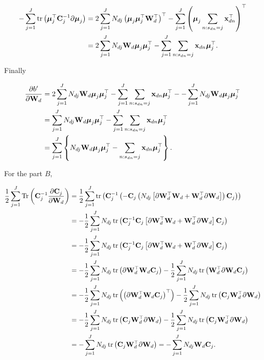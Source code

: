 	\begin{align}
	-\sum_{j=1}^{J}\operatorname{tr}\left( \boldsymbol{\mu}_j^\top\mathbf{C}_j^{-1}\partial\boldsymbol{\mu}_j\right) &= 2\sum_{j=1}^{J}N_{dj}\left(\boldsymbol{\mu}_j\boldsymbol{\mu}_j^\top\mathbf{W}_d^\top\right)^\top-\sum_{j=1}^{J}\left(\boldsymbol{\mu}_j\sum_{n:s_{dn}=j}\mathbf{x}_{dn}^\top\right)^\top \notag \\
	&= 2\sum_{j=1}^{J}N_{dj}\mathbf{W}_d\boldsymbol{\mu}_j\boldsymbol{\mu}_j^\top - \sum_{j=1}^{J}\sum_{n:s_{dn}=j}\mathbf{x}_{dn} \boldsymbol{\mu}_j^\top .
	\end{align}
	
	Finally 
	
	\begin{align}
	\frac{\partial b'}{\partial\mathbf{W}_d} &= 2\sum_{j=1}^{J}N_{dj}\mathbf{W}_d\boldsymbol{\mu}_j\boldsymbol{\mu}_j^\top - \sum_{j=1}^{J}\sum_{n:s_{dn}=j}\mathbf{x}_{dn} \boldsymbol{\mu}_j^\top -  -\sum_{j=1}^{J} N_{dj} \mathbf{W}_d \boldsymbol{\mu}_j\boldsymbol{\mu}_j^\top \notag \\
	&= \sum_{j=1}^{J}N_{dj}\mathbf{W}_d\boldsymbol{\mu}_j\boldsymbol{\mu}_j^\top - \sum_{j=1}^{J}\sum_{n:s_{dn}=j}\mathbf{x}_{dn} \boldsymbol{\mu}_j^\top \notag \\
	&= \sum_{j=1}^{J}\left\{N_{dj}\mathbf{W}_d\boldsymbol{\mu}_j\boldsymbol{\mu}_j^\top - \sum_{n:s_{dn}=j}\mathbf{x}_{dn} \boldsymbol{\mu}_j^\top\right\}.
	\end{align}
	
	For the part $B$,
	
	\begin{align}
	\frac{1}{2}\sum_{j=1}^{J} \operatorname{Tr}\left(\mathbf{C}_j^{-1}\frac{\partial \mathbf{C}_j}{\partial\mathbf{W}_d}\right) &= \frac{1}{2}\sum_{j=1}^{J} \operatorname{tr}\left(\mathbf{C}_j^{-1}\left(-\mathbf{C}_j\left(N_{dj}\left[\partial\mathbf{W}_d^\top\mathbf{W}_d+\mathbf{W}_d^\top\partial\mathbf{W}_d\right]\right)\mathbf{C}_j\right)\right) \notag \\
	&= -\frac{1}{2}\sum_{j=1}^{J}N_{dj}\operatorname{tr}\left(\mathbf{C}_j^{-1}\mathbf{C}_j\left[\partial\mathbf{W}_d^\top\mathbf{W}_d+\mathbf{W}_d^\top\partial\mathbf{W}_d\right]\mathbf{C}_j\right) \notag \\
	&= -\frac{1}{2}\sum_{j=1}^{J}N_{dj}\operatorname{tr}\left(\mathbf{C}_j^{-1}\mathbf{C}_j\left[\partial\mathbf{W}_d^\top\mathbf{W}_d+\mathbf{W}_d^\top\partial\mathbf{W}_d\right]\mathbf{C}_j\right) \notag \\
	&= -\frac{1}{2}\sum_{j=1}^{J}N_{dj}\operatorname{tr}\left(\partial\mathbf{W}_d^\top\mathbf{W}_d\mathbf{C}_j\right) -\frac{1}{2}\sum_{j=1}^{J}N_{dj}\operatorname{tr}\left(\mathbf{W}_d^\top\partial\mathbf{W}_d\mathbf{C}_j\right)\notag \\
	&= -\frac{1}{2}\sum_{j=1}^{J}N_{dj}\operatorname{tr}\left(\left(\partial\mathbf{W}_d^\top\mathbf{W}_d\mathbf{C}_j\right)^\top\right) -\frac{1}{2}\sum_{j=1}^{J}N_{dj}\operatorname{tr}\left(\mathbf{C}_j\mathbf{W}_d^\top\partial\mathbf{W}_d\right)\notag \\
	&= -\frac{1}{2}\sum_{j=1}^{J}N_{dj}\operatorname{tr}\left(\mathbf{C}_j\mathbf{W}_d^\top\partial\mathbf{W}_d\right) -\frac{1}{2}\sum_{j=1}^{J}N_{dj}\operatorname{tr}\left(\mathbf{C}_j\mathbf{W}_d^\top\partial\mathbf{W}_d\right)\notag \\
	&=-\sum_{j=1}^{J}N_{dj}\operatorname{tr}\left(\mathbf{C}_j\mathbf{W}_d^\top\partial\mathbf{W}_d\right)= -\sum_{j=1}^{J}N_{dj}\mathbf{W}_d\mathbf{C}_j.
	\end{align}
	
